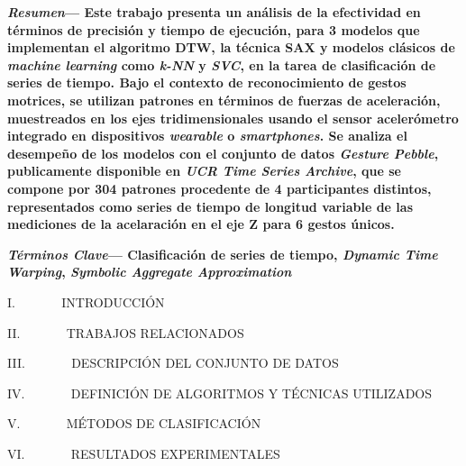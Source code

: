 \documentclass[10pt]{article}
\begin{document}
	
	

	\begin{multicols}{2}
		
		{\small
			\justifying
			\textbf{\textit{Resumen}--- Este trabajo presenta un análisis de la efectividad en términos de precisión y tiempo de ejecución, para 3 modelos que implementan el algoritmo DTW, la técnica SAX y modelos clásicos de \textit{machine learning} como \textit{k-NN} y \textit{SVC}, en la tarea de clasificación de series de tiempo. Bajo el contexto de reconocimiento de gestos motrices, se utilizan patrones en términos de fuerzas de aceleración, muestreados en los ejes tridimensionales usando el sensor acelerómetro integrado en dispositivos \textit{wearable} o \textit{smartphones}. Se analiza el desempeño de los modelos con el conjunto de datos \textit{Gesture Pebble}, publicamente disponible en \textit{UCR Time Series Archive}, que se compone por 304 patrones procedente de 4 participantes distintos, representados como series de tiempo de longitud variable de las mediciones de la acelaración en el eje Z para 6 gestos únicos.}
			
			\hfill\break
			\justifying
			\textbf{\textit{Términos Clave}--- Clasificación de series de tiempo, \textit{Dynamic Time Warping}, \textit{Symbolic Aggregate Approximation}}
		}
		
		\hfill\break
		\centering
		I. ~~~~~~ INTRODUCCIÓN
		
		
		
		\hfill\break
		\centering
		II. ~~~~~~ TRABAJOS RELACIONADOS
		
		
		
		\hfill\break
		\centering
		III. ~~~~~~ DESCRIPCIÓN DEL CONJUNTO DE DATOS
		
		
		
		\hfill\break
		\centering
		IV. ~~~~~~ DEFINICIÓN DE ALGORITMOS Y TÉCNICAS UTILIZADOS
		
		
		
		\hfill\break
		\centering
		V. ~~~~~~ MÉTODOS DE CLASIFICACIÓN
		
		
		
		\hfill\break
		\justifying
		
		\hfill\break
		\centering
		VI. ~~~~~~ RESULTADOS EXPERIMENTALES
		
		
		
		\hfill\break
		\justifying
		

\end{multicols}
\end{document}
